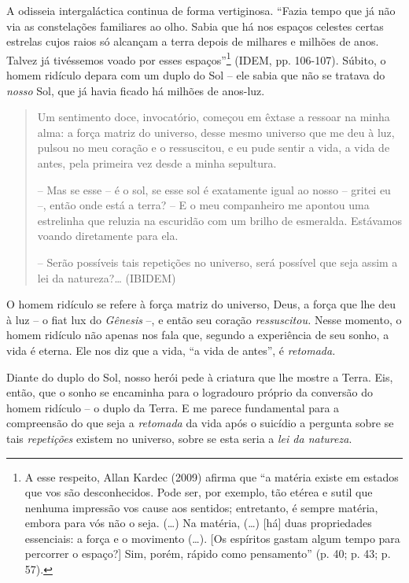 A odisseia intergaláctica continua de forma vertiginosa. ``Fazia tempo
que já não via as constelações familiares ao olho. Sabia que há nos
espaços celestes certas estrelas cujos raios só alcançam a terra depois
de milhares e milhões de anos. Talvez já tivéssemos voado por esses
espaços''\footnote{A esse respeito, Allan Kardec (2009) afirma que ``a
  matéria existe em estados que vos são desconhecidos. Pode ser, por
  exemplo, tão etérea e sutil que nenhuma impressão vos cause aos
  sentidos; entretanto, é sempre matéria, embora para vós não o seja.
  (\ldots{}) Na matéria, (\ldots{}) {[}há{]} duas propriedades
  essenciais: a força e o movimento (\ldots{}). {[}Os espíritos gastam
  algum tempo para percorrer o espaço?{]} Sim, porém, rápido como
  pensamento'' (p. 40; p. 43; p. 57).} (IDEM, pp. 106-107). Súbito, o
homem ridículo depara com um duplo do Sol -- ele sabia que não se
tratava do \emph{nosso} Sol, que já havia ficado há milhões de anos-luz.

\begin{quote}
Um sentimento doce, invocatório, começou em êxtase a ressoar na minha
alma: a força matriz do universo, desse mesmo universo que me deu à luz,
pulsou no meu coração e o ressuscitou, e eu pude sentir a vida, a vida
de antes, pela primeira vez desde a minha sepultura.

-- Mas se esse -- é o sol, se esse sol é exatamente igual ao nosso --
gritei eu --, então onde está a terra? -- E o meu companheiro me apontou
uma estrelinha que reluzia na escuridão com um brilho de esmeralda.
Estávamos voando diretamente para ela.

-- Serão possíveis tais repetições no universo, será possível que seja
assim a lei da natureza?\ldots{} (IBIDEM)
\end{quote}

O homem ridículo se refere à força matriz do universo, Deus, a força que
lhe deu à luz -- o fiat lux do \emph{Gênesis} --, e então seu coração
\emph{ressuscitou.} Nesse momento, o homem ridículo não apenas nos fala
que, segundo a experiência de seu sonho, a vida é eterna. Ele nos diz
que a vida, ``a vida de antes'', é \emph{retomada. }

Diante do duplo do Sol, nosso herói pede à criatura que lhe mostre a
Terra. Eis, então, que o sonho se encaminha para o logradouro próprio da
conversão do homem ridículo -- o duplo da Terra. E me parece fundamental
para a compreensão do que seja a \emph{retomada} da vida após o suicídio
a pergunta sobre se tais \emph{repetições} existem no universo, sobre se
esta seria a \emph{lei da natureza}.

